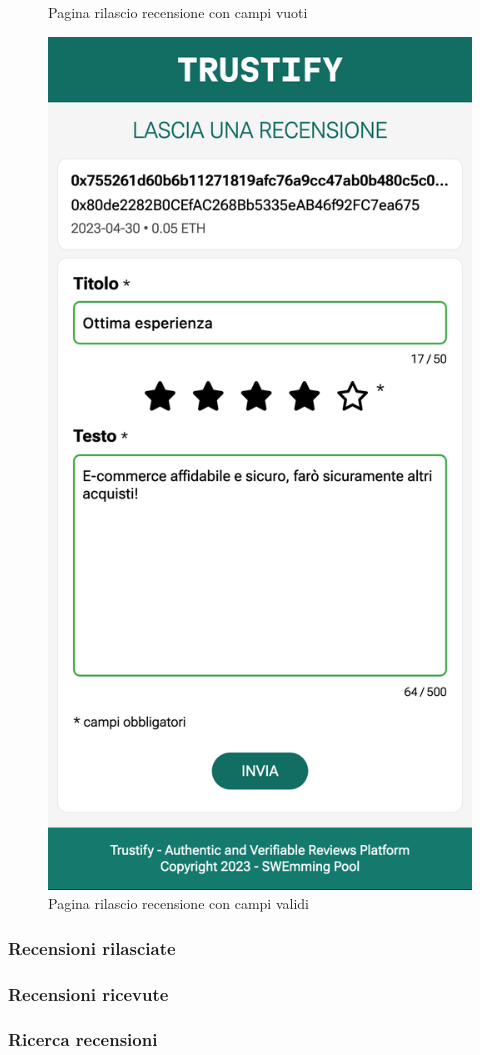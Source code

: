 \begin{figure}[H]
      \caption{Pagina rilascio recensione con campi vuoti}\label{fig:rilascio_recensione}
    \endminipage\hfill
      \includegraphics[width=\linewidth]{src/img/rilascio_recensione_valid.png}
      \caption{Pagina rilascio recensione con campi validi}\label{fig:rilascio_recensione_valid}
    \endminipage\hfill
\end{figure}


\subsubsection{Recensioni rilasciate}

\subsubsection{Recensioni ricevute}

\subsubsection{Ricerca recensioni}